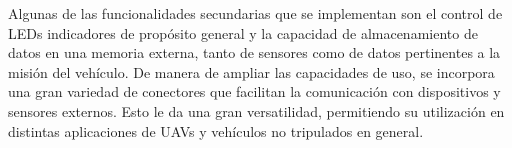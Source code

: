 
Algunas de las funcionalidades secundarias que se implementan son el control de LEDs indicadores de propósito general y la capacidad de almacenamiento de datos en una memoria externa, tanto de sensores como de datos pertinentes a la misión del vehículo. De manera de ampliar las capacidades de uso, se incorpora una gran variedad de conectores que facilitan la comunicación con dispositivos y sensores externos. Esto le da una gran versatilidad, permitiendo su utilización en distintas aplicaciones de UAVs y vehículos no tripulados en general.











